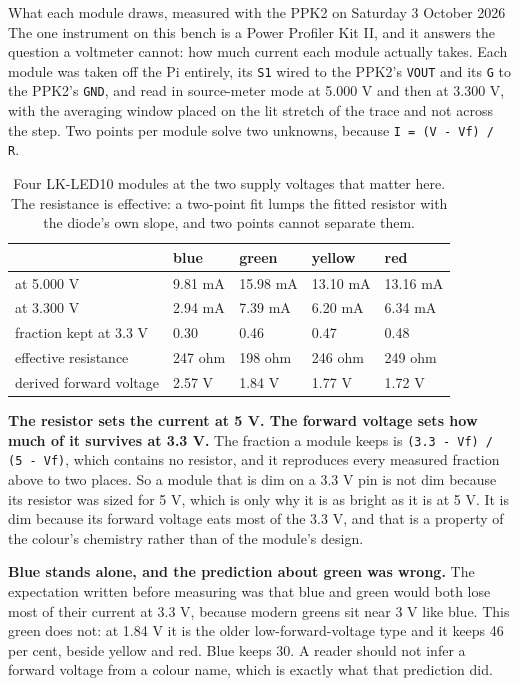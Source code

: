 \begin{note}{What each module draws, measured with the PPK2 on Saturday 3 October 2026}
The one instrument on this bench is a Power Profiler Kit II, and it answers the question a voltmeter cannot: how much current each module actually takes. Each module was taken off the Pi entirely, its \texttt{S1} wired to the PPK2's \texttt{VOUT} and its \texttt{G} to the PPK2's \texttt{GND}, and read in source-meter mode at 5.000 V and then at 3.300 V, with the averaging window placed on the lit stretch of the trace and not across the step. Two points per module solve two unknowns, because \texttt{I = (V - Vf) / R}.

\begin{table}[H]\centering\small
\begin{tabular}{p{34mm}p{18mm}p{18mm}p{18mm}p{18mm}}
\toprule
 & blue & green & yellow & red \\
\midrule
at 5.000 V & 9.81 mA & 15.98 mA & 13.10 mA & 13.16 mA \\
at 3.300 V & 2.94 mA & 7.39 mA & 6.20 mA & 6.34 mA \\
fraction kept at 3.3 V & 0.30 & 0.46 & 0.47 & 0.48 \\
effective resistance & 247 ohm & 198 ohm & 246 ohm & 249 ohm \\
derived forward voltage & 2.57 V & 1.84 V & 1.77 V & 1.72 V \\
\bottomrule
\end{tabular}
\caption{Four LK-LED10 modules at the two supply voltages that matter here. The resistance is effective: a two-point fit lumps the fitted resistor with the diode's own slope, and two points cannot separate them.}
\end{table}

\textbf{The resistor sets the current at 5 V. The forward voltage sets how much of it survives at 3.3 V.} The fraction a module keeps is \texttt{(3.3 - Vf) / (5 - Vf)}, which contains no resistor, and it reproduces every measured fraction above to two places. So a module that is dim on a 3.3 V pin is not dim because its resistor was sized for 5 V, which is only why it is as bright as it is at 5 V. It is dim because its forward voltage eats most of the 3.3 V, and that is a property of the colour's chemistry rather than of the module's design.

\textbf{Blue stands alone, and the prediction about green was wrong.} The expectation written before measuring was that blue and green would both lose most of their current at 3.3 V, because modern greens sit near 3 V like blue. This green does not: at 1.84 V it is the older low-forward-voltage type and it keeps 46 per cent, beside yellow and red. Blue keeps 30. A reader should not infer a forward voltage from a colour name, which is exactly what that prediction did.


\end{note}
